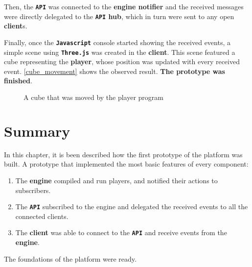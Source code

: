 \documentclass[a4paper,11pt,titlepage,abstract,numbers=noenddot,automark,mnsy,intlimits,rgb,dvipsnames]{report}
\begin{document}
Then, the \textbf{\texttt{API}} was connected to the \textbf{engine notifier} and the received messages were directly delegated to the \textbf{\texttt{API} hub},
which in turn were sent to any open \textbf{client}s.

Finally, once the \textbf{\texttt{Javascript}} console started showing the received events, a simple scene using \textbf{\texttt{Three.js}} was created in the
\textbf{client}. This scene featured a cube representing the \textbf{player}, whose position was updated with every received event.
\autoref{cube_movement} shows the observed result. \textbf{The prototype was finished}.
\begin{figure}[H]
\begin{center}
\noindent{}
\end{center}
\caption{A cube that was moved by the player program}
\label{cube_movement}
\end{figure}
\section{Summary}
In this chapter, it is been described how the first prototype of the platform was built. A prototype that implemented the
most basic features of every component:
\begin{enumerate}
\item
The \textbf{engine} compiled and run players, and notified their actions to subscribers.
\item
The \textbf{\texttt{API}} subscribed to the engine and delegated the received events to all the connected clients.
\item
The \textbf{client} was able to connect to the \textbf{\texttt{API}} and receive events from the \textbf{engine}.
\end{enumerate}
The foundations of the platform were ready.
\end{document}

